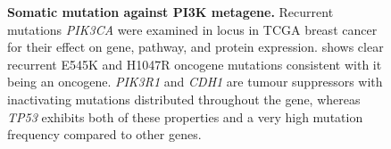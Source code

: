 \begin{figure}[!ht]
\begin{mdframed}
\begin{center}
    \end{center}
    \caption[Somatic mutation against PI3K metagene]{\small \textbf{Somatic mutation against PI3K metagene.} Recurrent mutations \textit{PIK3CA} were examined in locus in TCGA breast cancer for their effect on gene, pathway, and protein expression. shows clear recurrent E545K and H1047R oncogene mutations consistent with it being an oncogene. \textit{PIK3R1} and \textit{CDH1} are tumour suppressors with inactivating mutations distributed throughout the gene, whereas \textit{TP53} exhibits both of these properties and a very high mutation frequency compared to other genes.
}
\label{fig:mutation_expr_mg}
\end{mdframed}
\end{figure}

